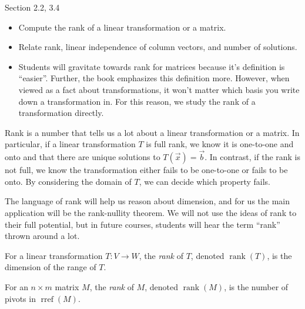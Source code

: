 \documentclass{problemset}
\DeclareMathOperator{\Rref}{rref}
\DeclareMathOperator{\Rank}{rank}
\newcommand{\rref}{\Rref}
\begin{document}
\begin{lesson}

	Section 2.2, 3.4

	\begin{itemize}
		\item Compute the rank of a linear transformation or a matrix.
		\item Relate rank, linear independence of column vectors, and number of solutions.
	\end{itemize}

	\begin{annotation}
		\begin{notes}
			\begin{itemize}
				\item Students will gravitate towards rank for matrices because it's definition
					is ``easier''. Further, the book emphasizes this definition more. However,
					when viewed as a fact about transformations, it won't matter which
					basis you write down a transformation in. For this reason, we study the
					rank of a transformation directly.
			\end{itemize}
		\end{notes}
	\end{annotation}
	Rank is a number that tells us a lot about a linear transformation or a matrix. In particular,
	if a linear transformation $T$ is full rank, we know it is one-to-one and onto and that there are unique
	solutions to $T(\vec x)=\vec b$. In contrast, if the rank is not full, we know the transformation either fails to be
	one-to-one or fails to be onto. By considering the domain of $T$, we can decide which property fails.

	The language of rank will help us reason about dimension, and for us the main application will be the
	rank-nullity theorem. We will not use the ideas of rank to their full potential, but in
	future courses, students will hear the term ``rank'' thrown around a lot.

\end{lesson}
	\begin{definition}[Rank]
		For a linear transformation $T:V\to W$, the \emph{rank} of $T$,
		denoted $\Rank(T)$, is the dimension of the range of $T$.

		For an $n\times m$ matrix $M$, the \emph{rank} of $M$, denoted
		$\Rank(M)$, is the number of pivots in $\rref(M)$.
	\end{definition}
\end{document}
